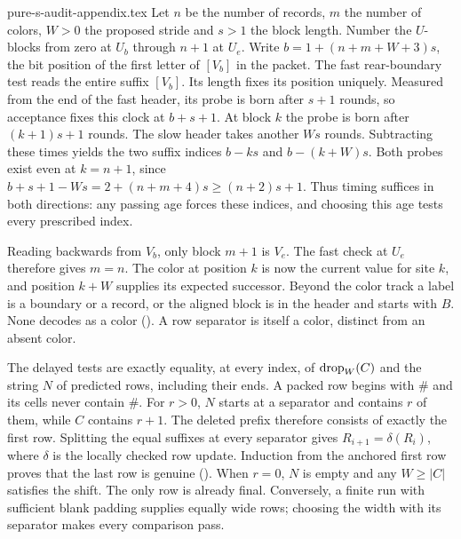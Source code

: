 \begin{filecontents*}[overwrite]{pure-s-audit-appendix.tex}
Let $n$ be the number of records, $m$ the number of colors, $W>0$ the
proposed stride and $s>1$ the block length. Number the $U$-blocks from
zero at $U_b$ through $n+1$ at $U_e$. Write
$b=1+(n+m+W+3)s$, the bit position of the first letter of $[V_b]$ in
the packet. The fast rear-boundary test reads the entire suffix $[V_b]$.
Its length fixes its position uniquely. Measured from the end of the
fast header, its probe is born after $s+1$ rounds, so acceptance fixes
this clock at $b+s+1$. At block $k$ the probe is born after
$(k+1)s+1$ rounds. The slow header takes another $Ws$ rounds. Subtracting
these times yields the two suffix indices $b-ks$ and $b-(k+W)s$.
Both probes exist even at $k=n+1$, since
$b+s+1-Ws=2+(n+m+4)s\ge(n+2)s+1$.
Thus timing suffices in both directions: any passing age forces these
indices, and choosing this age tests every prescribed index.

Reading backwards from $V_b$, only block $m+1$ is $V_e$.
The fast check at $U_e$ therefore gives $m=n$. The color at position
$k$ is now the current value for site $k$, and position $k+W$ supplies
its expected successor. Beyond the color track a label is a boundary
or a record, or the aligned block is in the header and starts with $B$.
None decodes as a color (). A row separator is
itself a color, distinct from an absent color.

The delayed tests are exactly equality, at every index, of
$\dropop_W(C)$ and the string $N$ of predicted rows, including their ends.
A packed row begins with $\#$ and its cells never contain $\#$.
For $r>0$, $N$ starts at a separator and contains $r$ of them, while $C$
contains $r+1$. The deleted prefix therefore consists of exactly the first
row. Splitting the equal suffixes at every separator gives
$R_{i+1}=\delta(R_i)$, where $\delta$ is the locally checked row update.
Induction from the anchored first row proves that the last row is genuine
(). When $r=0$, $N$ is empty and any
$W\ge|C|$ satisfies the shift. The only row is already final. Conversely,
a finite run with sufficient blank padding supplies equally wide rows;
choosing the width with its separator makes every comparison pass.


\end{filecontents*}
